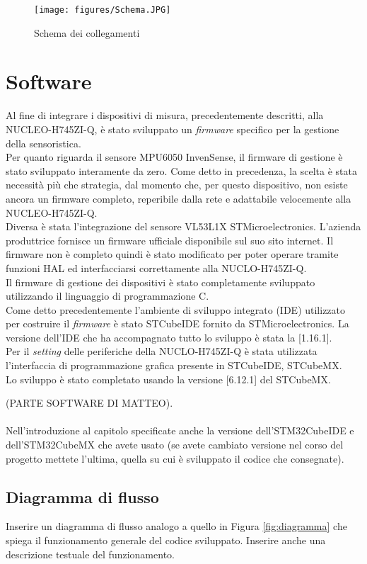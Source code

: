 \documentclass[11pt]{report}
\begin{document}
\begin{figure}[H]
\centering
\texttt{[image: figures/Schema.JPG]}
\caption{Schema dei collegamenti}
\label{fig:schema}
\end{figure}


\chapter{Software}
Al fine di integrare i dispositivi di misura, precedentemente descritti, alla NUCLEO-H745ZI-Q, è stato sviluppato un \textit{firmware} specifico per la gestione della sensoristica.\\
Per quanto riguarda il sensore MPU6050 InvenSense, il firmware di gestione è stato sviluppato interamente da zero. Come detto in precedenza, la scelta è stata necessità più che strategia, dal momento che, per questo dispositivo, non esiste ancora un firmware completo, reperibile dalla rete e adattabile velocemente alla NUCLEO-H745ZI-Q.\\
Diversa è stata l'integrazione del sensore VL53L1X STMicroelectronics. L'azienda produttrice fornisce un firmware ufficiale disponibile sul suo sito internet. Il firmware non è completo quindi è stato modificato per poter operare tramite funzioni HAL ed interfacciarsi correttamente alla NUCLO-H745ZI-Q.\\
Il firmware di gestione dei dispositivi è stato completamente sviluppato utilizzando il linguaggio di programmazione C.\\
Come detto precedentemente l'ambiente di sviluppo integrato (IDE) utilizzato per costruire il \textit{firmware} è stato STCubeIDE fornito da STMicroelectronics. La versione dell'IDE che ha accompagnato tutto lo sviluppo è stata la [1.16.1].\\
Per il \textit{setting} delle periferiche della NUCLO-H745ZI-Q è stata utilizzata l'interfaccia di programmazione grafica presente in STCubeIDE, STCubeMX.\\
Lo sviluppo è stato completato usando la versione [6.12.1] del STCubeMX.

(PARTE SOFTWARE DI MATTEO).
\\\\Nell'introduzione al capitolo specificate anche la versione dell'STM32CubeIDE e dell'STM32CubeMX che avete usato (se avete cambiato versione nel corso del progetto mettete l'ultima, quella su cui è sviluppato il codice che consegnate).

\section{Diagramma di flusso}
Inserire un diagramma di flusso analogo a quello in Figura \ref{fig:diagramma} che spiega il funzionamento generale del codice sviluppato. Inserire anche una descrizione testuale del funzionamento.
\end{document}
